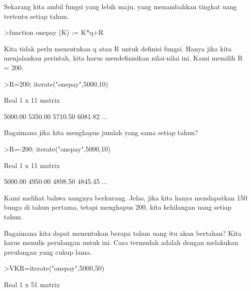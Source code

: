 \documentclass[a4paper,10pt]{article}
\begin{document}
\begin{eulernotebook}
\begin{eulercomment}
\end{eulercomment}
\begin{eulercomment}
Sekarang kita ambil fungsi yang lebih maju, yang menambahkan tingkat
uang tertentu setiap tahun.
\end{eulercomment}
\begin{eulerprompt}
>function onepay (K) := K*q+R
\end{eulerprompt}
\begin{eulercomment}
Kita tidak perlu menentukan q atau R untuk definisi fungsi. Hanya jika
kita menjalankan perintah, kita harus mendefinisikan nilai-nilai ini.
Kami memilih R = 200.
\end{eulercomment}
\begin{eulerprompt}
>R=200; iterate("onepay",5000,10)
\end{eulerprompt}
\begin{euleroutput}
  Real 1 x 11 matrix
  
      5000.00     5350.00     5710.50     6081.82     ...
\end{euleroutput}
\begin{eulercomment}
Bagaimana jika kita menghapus jumlah yang sama setiap tahun?
\end{eulercomment}
\begin{eulerprompt}
>R=-200; iterate("onepay",5000,10)
\end{eulerprompt}
\begin{euleroutput}
  Real 1 x 11 matrix
  
      5000.00     4950.00     4898.50     4845.45     ...
\end{euleroutput}
\begin{eulercomment}
Kami melihat bahwa uangnya berkurang. Jelas, jika kita hanya
mendapatkan 150 bunga di tahun pertama, tetapi menghapus 200, kita
kehilangan uang setiap tahun.

Bagaimana kita dapat menentukan berapa tahun uang itu akan bertahan?
Kita harus menulis perulangan untuk ini. Cara termudah adalah dengan
melakukan perulangan yang cukup lama.
\end{eulercomment}
\begin{eulerprompt}
>VKR=iterate("onepay",5000,50)
\end{eulerprompt}
\begin{euleroutput}
  Real 1 x 51 matrix
  

\end{euleroutput}
\end{eulernotebook}
\end{document}
